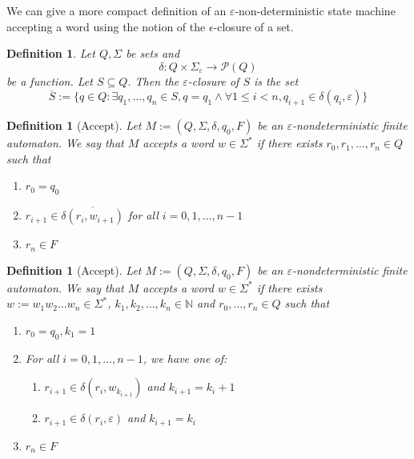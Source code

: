 \documentclass{article}
\theoremstyle{break}
\newtheorem{definition}[theorem]{Definition}
\begin{document}
We can give a more compact definition of an $\varepsilon$-non-deterministic state machine accepting a word using the notion of the $\epsilon$-closure of a set.

\begin{definition}
  Let $Q,\Sigma$ be sets and 
  \[\delta: Q\times\Sigma_{\varepsilon} \to \mathcal{P}(Q) \]
  be a function. 
  Let $S \subseteq Q$. 
  Then the $\varepsilon$-closure of $S$ is the set
  \[\overline{S} := \{q \in Q: \exists q_1,\ldots,q_n \in S, q=q_1 \wedge \forall 1 \leq i < n, q_{i+1} \in \delta(q_i,\varepsilon) \}\]
\end{definition}


\begin{definition}[Accept]
  \label{def:epsilon-nondeterministic-finite-automaton-accept-aug-closure}
  Let $M:=(Q,\Sigma,\delta,q_0,F)$ be an $\varepsilon$-nondeterministic finite automaton.
  We say that $M$ accepts a word $w \in \Sigma^*$ if there exists $r_0,r_1,\ldots,r_n \in Q$ such that
    \begin{enumerate}
      \item $r_0=q_0$
      \item $r_{i+1} \in \overline{\delta(r_i, w_{i+1})}$ for all $i = 0,1,\ldots, n-1$
      \item $r_n\in F$
    \end{enumerate}
\end{definition}


\begin{definition}[Accept]
  \label{def:epsilon-nondeterministic-finite-automaton-accept-closure}
  Let $M:=(Q,\Sigma,\delta,q_0,F)$ be an $\varepsilon$-nondeterministic finite automaton.
  We say that $M$ accepts a word $w \in \Sigma^*$ if there exists $w:=w_1w_2\ldots w_n \in\Sigma^*$, $k_1, k_2, \ldots, k_n \in \mathbb{N}$ and $r_0,\ldots,r_n\in Q$ such that
    \begin{enumerate}
      \item $r_0=q_0, k_1=1$
      \item For all $i = 0,1,\ldots, n-1$, we have one of:
      \begin{enumerate}
        \item $r_{i+1} \in \delta(r_i, w_{k_{i+1}})$ and $k_{i+1}=k_i+1$
        \item $r_{i+1} \in \delta(r_i, \varepsilon)$ and $k_{i+1}=k_i$
      \end{enumerate}
      \item $r_n\in F$
    \end{enumerate}
\end{definition}
\end{document}
